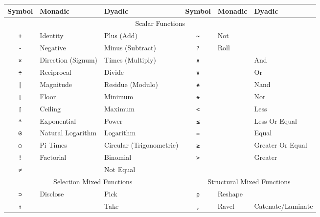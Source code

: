 ﻿\documentclass[numbers,10pt,preprint]{sigplanconf}
\begin{document}
\begin{table}
\centering
\begin{tabular}{cllcll}
\toprule
Symbol                   & Monadic            & Dyadic  &
Symbol                   & Monadic            & Dyadic  \\
\midrule
\multicolumn{6}{c}{Scalar Functions} \\ 
\midrule
\texttt{+}               & Identity           & Plus (Add) &
\texttt{\textasciitilde} & Not                & \\
\texttt{-}               & Negative           & Minus (Subtract) &
\texttt{?}               & Roll               & \\
\texttt{×}               & Direction (Signum) & Times (Multiply) &
\texttt{∧}               &                    & And \\
\texttt{÷}               & Reciprocal         & Divide &
\texttt{∨}               &                    & Or \\
\texttt{|}               & Magnitude          & Residue (Modulo) &
\texttt{⍲}               &                    & Nand \\
\texttt{⌊}               & Floor              & Minimum &
\texttt{⍱}               &                    & Nor \\
\texttt{⌈}               & Ceiling            & Maximum &
\texttt{<}               &                    & Less \\
\texttt{*}               & Exponential        & Power &
\texttt{≤}               &                    & Less Or Equal \\
\texttt{⍟}               & Natural Logarithm  & Logarithm &
\texttt{=}               &                    & Equal \\
\texttt{○}               & Pi Times           & Circular (Trigonometric) &
\texttt{≥}               &                    & Greater Or Equal \\
\texttt{!}               & Factorial          & Binomial &
\texttt{>}               &                    & Greater \\
\texttt{≠}               &                    & Not Equal \\
\midrule
\multicolumn{3}{c}{Selection Mixed Functions} &
\multicolumn{3}{c}{Structural Mixed Functions} \\
\cmidrule(r){1-3} \cmidrule(l){4-6}
\texttt{⊃}               & Disclose & Pick &
\texttt{⍴} & Reshape       & \\
\texttt{↑}               &          & Take &
\texttt{,} & Ravel         & Catenate/Laminate \\

\end{tabular}
\end{table}
\end{document}
